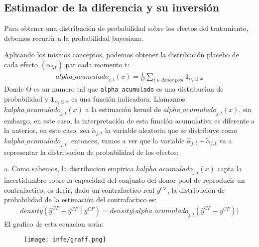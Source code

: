 \documentclass[12pt]{article}
\begin{document}
\subsection{Estimador de la diferencia y su inversión}
Para obtener una distribución de probabilidad sobre los efectos del tratamiento, debemos recurrir a la probabilidad bayesiana.

Aplicando los mismos conceptos, podemos obtener la distribución placebo de cada efecto {$ (\alpha_{j,t}) $} par cada momento t:
\begin{align*}
    {alpha\_acumulado}_{j,t}\left(x\right)=\frac{1}{O}\sum_{i\in d o n o r\ pool}\mathbf{1}_{\alpha_i\le x}
\end{align*}
Donde O es un numero tal que \texttt{alpha\_acumulado}  es una distribucion de probabilidad y {$ \mathbf{1}_{\alpha_i\le x} $} es una función indicadora. 
Llamamos {$ k{alpha\_acumulado}_{j,t}\left(x\right) $} a la estimación kernel de {$ {alpha\_acumulado}_{j,t}\left(x\right) $}, sin embargo, en este caso, la interpretación de esta función acumulativa es diferente a la anterior, en este caso, sea {$ {\widetilde{\alpha}}_{j,t} $} la variable aleatoria que se distribuye como {$ {kalpha\_acumulado}_{j,t} $}, entonces, vamos a ver que la variable {$ {\hat{\alpha}}_{j,t}+{\widetilde{\alpha}}_{j,t} $} va a representar la distribucion de probabilidad de los efectos: 


a. Como sabemos, la distribucion empirica {$ k{alpha\_acumulado}_{j,t}\left(x\right) $} capta la incertidumbre sobre la capacidad del conjunto del donor pool de reproducir un contrafactico, es decir, dado un contrafactico real {$ y^{CF} $}, la distribución de probabilidad de la estimación del contrafactico es:
\begin{align*}
    density\left({\hat{y}}^{CF}-y^{CF}\middle| y^{CF}\right)={density(alpha\_acumulado}_{j,t}\left({\hat{y}}^{CF}-y^{CF}\right))
\end{align*}
El grafico de esta ecuacion seria:

\begin{figure}[H]
\centering
\texttt{[image: infe/graff.png]}
\end{figure}
\end{document}

